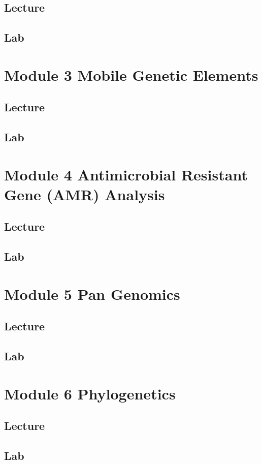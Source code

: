 \documentclass[
]{book}
\begin{document}
\section{Lecture}\label{lecture-1}

\section{Lab}\label{lab-1}

\chapter{Module 3 Mobile Genetic Elements}\label{module-3-mobile-genetic-elements}

\section{Lecture}\label{lecture-2}

\section{Lab}\label{lab-2}

\chapter{Module 4 Antimicrobial Resistant Gene (AMR) Analysis}\label{module-4-antimicrobial-resistant-gene-amr-analysis}

\section{Lecture}\label{lecture-3}

\section{Lab}\label{lab-3}

\chapter{Module 5 Pan Genomics}\label{module-5-pan-genomics}

\section{Lecture}\label{lecture-4}

\section{Lab}\label{lab-4}

\chapter{Module 6 Phylogenetics}\label{module-6-phylogenetics}

\section{Lecture}\label{lecture-5}

\section{Lab}\label{lab-5}


\end{document}
